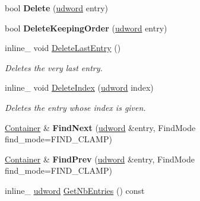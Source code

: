 \begin{DoxyCompactItemize}
\item 
\hypertarget{class_container_af26b7fe0482696af03c7b14b94619995}{bool {\bfseries Delete} (\hyperlink{_ice_types_8h_a44c6f1920ba5551225fb534f9d1a1733}{udword} entry)}\label{class_container_af26b7fe0482696af03c7b14b94619995}

\item 
\hypertarget{class_container_a57191aecc817cf1c87d40beeff33c975}{bool {\bfseries Delete\+Keeping\+Order} (\hyperlink{_ice_types_8h_a44c6f1920ba5551225fb534f9d1a1733}{udword} entry)}\label{class_container_a57191aecc817cf1c87d40beeff33c975}

\item 
\hypertarget{class_container_abfc2182a69a695b274efc258e5816aff}{inline\+\_\+ void \hyperlink{class_container_abfc2182a69a695b274efc258e5816aff}{Delete\+Last\+Entry} ()}\label{class_container_abfc2182a69a695b274efc258e5816aff}

\begin{DoxyCompactList}\small\item\em Deletes the very last entry. \end{DoxyCompactList}\item 
\hypertarget{class_container_a2b617daa7417d0aac0646bbf7cc12c1c}{inline\+\_\+ void \hyperlink{class_container_a2b617daa7417d0aac0646bbf7cc12c1c}{Delete\+Index} (\hyperlink{_ice_types_8h_a44c6f1920ba5551225fb534f9d1a1733}{udword} index)}\label{class_container_a2b617daa7417d0aac0646bbf7cc12c1c}

\begin{DoxyCompactList}\small\item\em Deletes the entry whose index is given. \end{DoxyCompactList}\item 
\hypertarget{class_container_a617f3bd81129baf3511e413fcf6a99c9}{\hyperlink{class_container}{Container} \& {\bfseries Find\+Next} (\hyperlink{_ice_types_8h_a44c6f1920ba5551225fb534f9d1a1733}{udword} \&entry, Find\+Mode find\+\_\+mode=F\+I\+N\+D\+\_\+\+C\+L\+A\+M\+P)}\label{class_container_a617f3bd81129baf3511e413fcf6a99c9}

\item 
\hypertarget{class_container_a208e17550e84b0615c30a0459eda5920}{\hyperlink{class_container}{Container} \& {\bfseries Find\+Prev} (\hyperlink{_ice_types_8h_a44c6f1920ba5551225fb534f9d1a1733}{udword} \&entry, Find\+Mode find\+\_\+mode=F\+I\+N\+D\+\_\+\+C\+L\+A\+M\+P)}\label{class_container_a208e17550e84b0615c30a0459eda5920}

\item 
\hypertarget{class_container_af970efd22b612ec421c0b3e44a484631}{inline\+\_\+ \hyperlink{_ice_types_8h_a44c6f1920ba5551225fb534f9d1a1733}{udword} \hyperlink{class_container_af970efd22b612ec421c0b3e44a484631}{Get\+Nb\+Entries} () const }\label{class_container_af970efd22b612ec421c0b3e44a484631}


\end{DoxyCompactItemize}
